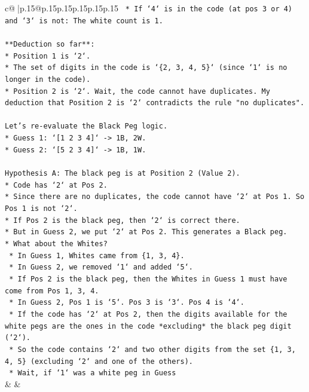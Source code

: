 \documentclass{article}
\begin{document}
{\begin{supertabular}{c@{$\;$}|p{.15\linewidth}@{}p{.15\linewidth}p{.15\linewidth}p{.15\linewidth}p{.15\linewidth}p{.15\linewidth}}
{{{\texttt{        *   If `4` is in the code (at pos 3 or 4) and `3` is not: The white count is 1.} \\
\\ 
\texttt{**Deduction so far**:} \\
\texttt{*   Position 1 is `2`.} \\
\texttt{*   The set of digits in the code is `\{2, 3, 4, 5\}` (since `1` is no longer in the code).} \\
\texttt{*   Position 2 is `2`. Wait, the code cannot have duplicates. My deduction that Position 2 is `2` contradicts the rule "no duplicates".} \\
\\ 
\texttt{Let's re{-}evaluate the Black Peg logic.} \\
\texttt{*   Guess 1: `{[}1 2 3 4{]}` {-}> 1B, 2W.} \\
\texttt{*   Guess 2: `{[}5 2 3 4{]}` {-}> 1B, 1W.} \\
\\ 
\texttt{Hypothesis A: The black peg is at Position 2 (Value 2).} \\
\texttt{*   Code has `2` at Pos 2.} \\
\texttt{*   Since there are no duplicates, the code cannot have `2` at Pos 1. So Pos 1 is not `2`.} \\
\texttt{*   If Pos 2 is the black peg, then `2` is correct there.} \\
\texttt{*   But in Guess 2, we put `2` at Pos 2. This generates a Black peg.} \\
\texttt{*   What about the Whites?} \\
\texttt{    *   In Guess 1, Whites came from \{1, 3, 4\}.} \\
\texttt{    *   In Guess 2, we removed `1` and added `5`.} \\
\texttt{    *   If Pos 2 is the black peg, then the Whites in Guess 1 must have come from Pos 1, 3, 4.} \\
\texttt{    *   In Guess 2, Pos 1 is `5`. Pos 3 is `3`. Pos 4 is `4`.} \\
\texttt{    *   If the code has `2` at Pos 2, then the digits available for the white pegs are the ones in the code *excluding* the black peg digit (`2`).} \\
\texttt{    *   So the code contains `2` and two other digits from the set \{1, 3, 4, 5\} (excluding `2` and one of the others).} \\
\texttt{    *   Wait, if `1` was a white peg in Guess} \\
            }
        }
    }
    & & \\ \\


\end{supertabular}}
\end{document}
